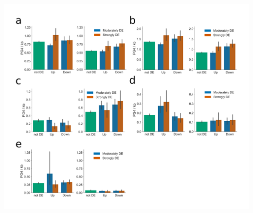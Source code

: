 \documentclass[12pt,a4paper,]{report}
\let\origfigure=\figure
\let\endorigfigure=\endfigure
\renewenvironment{figure}[1][2] {
    \expandafter\origfigure\expandafter[H]
} {
    \endorigfigure
}
\begin{document}
\newpage

\begin{figure}[htbp]
\centering
\includegraphics[width=\textwidth,height=562pt,keepaspectratio]{chapter_5/figures/drought_regulated_g4_distribution.png}

\end{figure}
\end{document}
